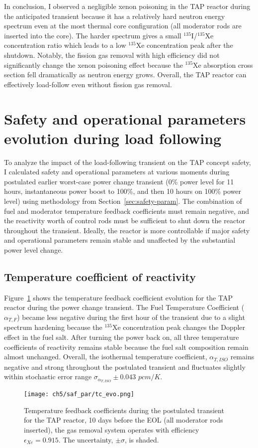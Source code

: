 In conclusion, I observed a negligible xenon poisoning in the \gls{TAP} 
reactor during the anticipated transient because it has a relatively hard 
neutron energy spectrum even at the most thermal core configuration (all 
moderator rods are inserted into the core). The harder spectrum gives 
a small $^{135}$I/$^{135}$Xe concentration ratio which leads to a low
$^{135}$Xe concentration peak after the shutdown. Notably, the fission gas 
removal with high efficiency did not significantly change the xenon poisoning 
effect because the $^{135}$Xe absorption cross section fell dramatically as 
neutron energy grows. Overall, the \gls{TAP} reactor can effectively 
load-follow even without fission gas removal. 

\section{Safety and operational parameters evolution during load following} 
\label{ch5:saf_param}
To analyze the impact of the load-following transient on the \gls{TAP} concept 
safety, I calculated safety and operational parameters at various moments 
during postulated earlier worst-case power change transient (0\% power level 
for 11 hours, instantaneous power boost to 100\%, and then 10 hours on 100\% 
power level) using methodology from Section~\ref{sec:safety-param}. The 
combination of fuel and moderator temperature feedback coefficients must 
remain negative, and the reactivity worth of control rods must be sufficient 
to shut down the reactor throughout the transient. Ideally, the reactor is 
more controllable if major safety and operational parameters remain stable and 
unaffected by the substantial power level change.

\subsection{Temperature coefficient of reactivity}
Figure~\ref{fig:lf-tap-tc-evo} shows the temperature feedback coefficient 
evolution for the \gls{TAP} reactor during the power change transient. The 
Fuel Temperature Coefficient ($\alpha_{T,F}$) became less negative during the 
first hour of the transient due to a slight spectrum hardening because the  
$^{135}$Xe concentration peak changes the Doppler effect in the fuel salt. 
After turning the power back on, all three temperature coefficients of 
reactivity remains stable because the fuel salt composition remain almost 
unchanged. Overall, the isothermal temperature coefficient, $\alpha_{T,ISO}$ 
remains negative and strong throughout the postulated transient and 
fluctuates slightly within stochastic error range 
$\sigma_{\alpha_{T,ISO}}\pm0.043$ $pcm/K$. 
\begin{figure}[htp!] %
	\centering
	\texttt{[image: ch5/saf\_par/tc\_evo.png]}
	\caption{Temperature feedback coefficients during the postulated 
		transient for the \gls{TAP} reactor, 10 days before the \gls{EOL} (all 
		moderator rods inserted), the gas removal system operates with 
		efficiency $\epsilon_{Xe}=0.915$. The uncertainty, $\pm\sigma$, is 
		shaded.}
		\label{fig:lf-tap-tc-evo}
\end{figure}

